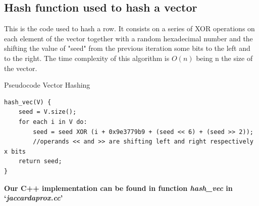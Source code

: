 \documentclass[12pt]{article}
\begin{document}
\subsection{Hash function used to hash a vector}
This is the code used to hash a row. It consists on a series of XOR operations on each element of the vector together with a random hexadecimal number and the shifting the value of "seed" from the previous iteration some bits to the left and to the right. The time complexity of this algorithm is $O(n)$ being n the size of the vector. 
\begin{center}
\begin{large}
Pseudocode Vector Hashing
\end{large}
\end{center}
 \begin{lstlisting}
hash_vec(V) {
	seed = V.size();
	for each i in V do:
		seed = seed XOR (i + 0x9e3779b9 + (seed << 6) + (seed >> 2));
		//operands << and >> are shifting left and right respectively x bits
	return seed;
}

\end{lstlisting}

\bigskip
\textbf{Our C++ implementation can be found in function \textit{hash\_vec} in `\textit{\mbox{jaccardaprox.cc}}'}
\end{document}
